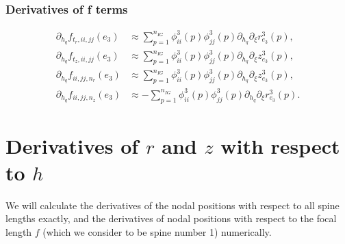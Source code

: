 \documentclass{article}
\begin{document}
\subsubsection{Derivatives of f terms}
\begin{align}
\partial_{h_q} f_{t_r,ii,jj}(e_3) &\approx \sum_{p=1}^{n_{IG}} \phi_{ii}^3(p) \phi_{jj}^3(p) \partial_{h_q} \partial_\xi r_{e_3}^3(p), \tag{21.128}\\
\partial_{h_q} f_{t_z,ii,jj}(e_3) &\approx \sum_{p=1}^{n_{IG}} \phi_{ii}^3(p) \phi_{jj}^3(p) \partial_{h_q} \partial_\xi z_{e_3}^3(p), \tag{21.131}\\
\partial_{h_q} f_{ii,jj,n_r}(e_3) &\approx \sum_{p=1}^{n_{IG}} \phi_{ii}^3(p) \phi_{jj}^3(p) \partial_{h_q} \partial_\xi z_{e_3}^3(p), \tag{21.134}\\
\partial_{h_q} f_{ii,jj,n_z}(e_3) &\approx -\sum_{p=1}^{n_{IG}} \phi_{ii}^3(p) \phi_{jj}^3(p) \partial_{h_q} \partial_\xi r_{e_3}^3(p). \tag{21.137}
\end{align}

\section{Derivatives of \(r\) and \(z\) with respect to \(h\)}
We will calculate the derivatives of the nodal positions with respect to all spine lengths exactly, and the derivatives of nodal positions with respect to the focal length \(f\) (which we consider to be spine number 1) numerically.
\end{document}
